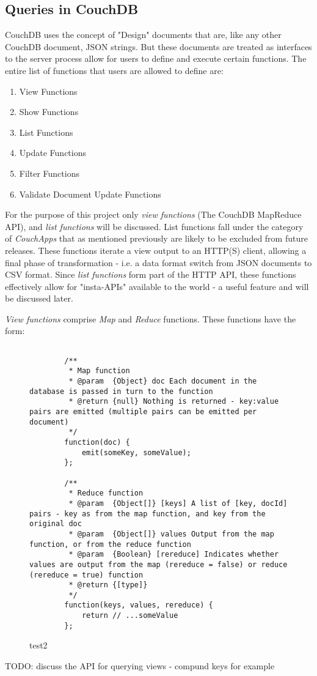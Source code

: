 \subsection{Queries in CouchDB}

CouchDB uses the concept of "Design" documents that are, like any other CouchDB document, JSON strings. But these documents are treated as interfaces to the server process allow for users to define and execute certain functions. The entire list of functions that users are allowed to define are:

\begin{enumerate}
    \item View Functions
    \item Show Functions
    \item List Functions
    \item Update Functions
    \item Filter Functions
    \item Validate Document Update Functions
\end{enumerate}

For the purpose of this project only \textit{view functions} (The CouchDB MapReduce API), and \textit{list functions} will be discussed. List functions fall under the category of \textit{CouchApps} that as mentioned previously are likely to be excluded from future releases. These functions iterate a view output to an HTTP(S) client, allowing a final phase of transformation - i.e. a data format switch from JSON documents to CSV format. Since \textit{list functions} form part of the HTTP API, these functions effectively allow for "insta-APIs" available to the world - a useful feature and will be discussed later.

\textit{View functions} comprise \textit{Map} and \textit{Reduce} functions. These functions have the form:

\begin{figure}[h]
    \centering
    \begin{verbatim} 

        /**
         * Map function
         * @param  {Object} doc Each document in the database is passed in turn to the function
         * @return {null} Nothing is returned - key:value pairs are emitted (multiple pairs can be emitted per document)
         */
        function(doc) {
            emit(someKey, someValue);
        };

        /**
         * Reduce function
         * @param  {Object[]} [keys] A list of [key, docId] pairs - key as from the map function, and key from the original doc
         * @param  {Object[]} values Output from the map function, or from the reduce function
         * @param  {Boolean} [rereduce] Indicates whether values are output from the map (rereduce = false) or reduce (rereduce = true) function
         * @return {[type]}
         */
        function(keys, values, rereduce) {
            return // ...someValue
        };
    \end{verbatim}
    \caption[test1]{test2}
    \label{couchmapreduce}
\end{figure}

TODO: discuss the API for querying views - compund keys for example